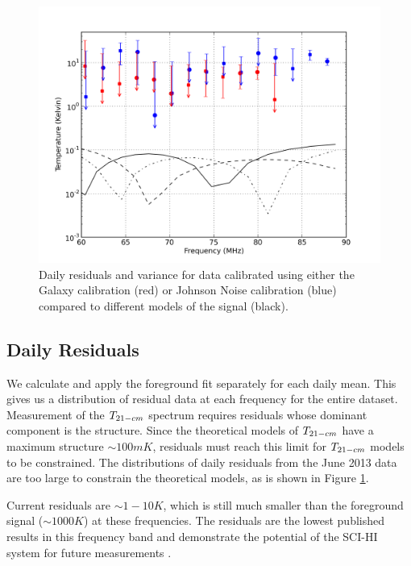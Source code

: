 \begin{figure}[htb]
\begin{center}
\includegraphics[width=0.95\linewidth]{Data_analysis/figures/joint_log_means.png}
\caption{Daily residuals and variance for data calibrated using either the Galaxy calibration (red) or Johnson Noise calibration (blue) compared to different models of the \cm signal (black). }
\label{Fig:resid}
\end{center}
\end{figure}


\subsection{Daily Residuals}

We calculate and apply the foreground fit separately for each daily mean. This gives us a distribution of residual data at each frequency for the entire dataset. Measurement of the $T_{21-cm}$ spectrum requires residuals whose dominant component is the \cm structure. Since the theoretical models of $T_{21-cm}$ have a maximum structure $\sim 100 mK$, residuals must reach this limit for $T_{21-cm}$ models to be constrained. The distributions of daily residuals from the June 2013 data are too large to constrain the theoretical models, as is shown in Figure \ref{Fig:resid}. 

Current residuals are $\sim 1-10K$, which is still much smaller than the foreground signal ($\sim 1000K$) at these frequencies. The residuals are the lowest published results in this frequency band and demonstrate the potential of the SCI-HI system for future measurements \cite{Voytek_2014}. 


